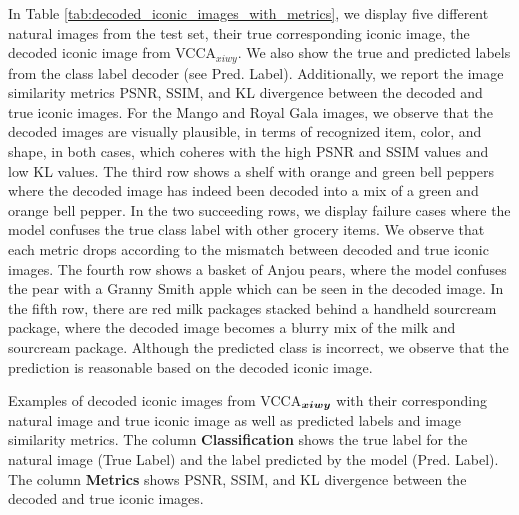 In Table \ref{tab:decoded_iconic_images_with_metrics}, we display five different natural images from the test set, their true corresponding iconic image, the decoded iconic image from VCCA$_{x i w y}$. 
We also show the true and predicted labels from the class label decoder (see Pred. Label). 
Additionally, we report the image similarity metrics PSNR, SSIM, and KL divergence between the decoded and true iconic images. For the Mango and Royal Gala images, we observe that the decoded images are visually plausible, in terms of recognized item, color, and shape, in both cases, which coheres with the high PSNR and SSIM values and low KL values.
The third row shows a shelf with orange and green bell peppers where the decoded image has indeed been decoded into a mix of a green and orange bell pepper. In the two succeeding rows, we display failure cases where the model confuses the true class label with other grocery items. We observe that each metric drops according to the mismatch between decoded and true iconic images. The fourth row shows a basket of Anjou pears, where the model confuses the pear with a Granny Smith apple which can be seen in the decoded image. In the fifth row, there are red milk packages stacked behind a handheld sourcream package, where the decoded image becomes a blurry mix of the milk and sourcream package. Although the predicted class is incorrect, we observe that the prediction is reasonable based on the decoded iconic image.


\begin{table}[t]
	\centering
	\caption{Examples of decoded iconic images from VCCA$_{{\bm{x}} {\bm{i}} {\bm{w}} {\bm{y}}}$ with their corresponding natural image and true iconic image as well as predicted labels and image similarity metrics. The column {\bf Classification} shows the true label for the natural image (True Label) and the label predicted by the model (Pred. Label). The column {\bf Metrics} shows PSNR, SSIM, and KL divergence between the decoded and true iconic images. }
	\vspace{-2mm}
	\resizebox{0.98\textwidth}{!}{
		
	}
	\label{tab:decoded_iconic_images_with_metrics}
	\vspace{-3mm}
\end{table}

